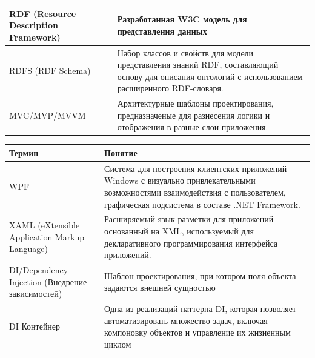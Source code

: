 \documentclass[12pt]{article}
\begin{document}
\begin{center}
\begin{tabular}{ | m{7cm} | m{7cm} | }
        \hline
        RDF (Resource Description Framework) & Разработанная W3C модель для представления данных                                                                                                                     \\
        \hline
        RDFS (RDF Schema)                    & Набор классов и свойств для модели представления знаний RDF, составляющий основу для описания онтологий с использованием расширенного RDF-словаря.                    \\
        \hline
        MVC/MVP/MVVM                         & Архитектурные шаблоны проектирования, предназначеные для разнесения логики и отображения в разные слои приложения.                                                    \\
        \hline
    \end{tabular}
\end{center}

\pagebreak

\begin{center}
    \begin{tabular}{ | m{7cm} | m{7cm} | }
        \hline
        \textbf{Термин}                                  & \textbf{Понятие}                                                                                                                                                                 \\
        \hline
        WPF                                              & Система для построения клиентских приложений Windows с визуально привлекательными возможностями взаимодействия с пользователем, графическая подсистема в составе .NET Framework. \\
        \hline
        XAML (eXtensible Application Markup Language)    & Расширяемый язык разметки для приложений основанный на XML, используемый для декларативного программирования интерфейса приложений.                                              \\
        \hline
        DI/Dependency Injection (Внедрение зависимостей) & Шаблон проектирования, при котором поля объекта задаются внешней сущностью                                                                                                       \\
        \hline
        DI Контейнер                                     & Одна из реализаций паттерна DI, которая позволяет автоматизировать множество задач, включая компоновку объектов и управление их жизненным циклом                                 \\
        \hline
    \end{tabular}
\end{center}
\end{document}
